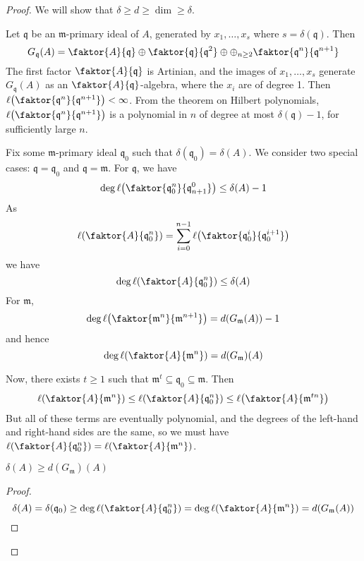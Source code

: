 \begin{proof}
    We will show that \( \delta \geq d \geq \dim \geq \delta \).

    Let \( \mathfrak q \) be an \( \mathfrak m \)-primary ideal of \( A \), generated by \( x_1, \dots, x_s \) where \( s = \delta(\mathfrak q) \).
    Then
    \[ G_{\mathfrak q}(A) = \faktor{A}{\mathfrak q} \oplus \faktor{\mathfrak q}{\mathfrak q^2} \oplus \oplus_{n \geq 2} \faktor{\mathfrak q^n}{\mathfrak q^{n+1}} \]
    The first factor \( \faktor{A}{\mathfrak q} \) is Artinian, and the images of \( x_1, \dots, x_s \) generate \( G_{\mathfrak q}(A) \) as an \( \faktor{A}{\mathfrak q} \)-algebra, where the \( x_i \) are of degree 1.
    Then \( \ell\qty(\faktor{\mathfrak q^n}{\mathfrak q^{n+1}}) < \infty \).
    From the theorem on Hilbert polynomials, \( \ell\qty(\faktor{\mathfrak q^n}{\mathfrak q^{n+1}}) \) is a polynomial in \( n \) of degree at most \( \delta(\mathfrak q) - 1 \), for sufficiently large \( n \).

    Fix some \( \mathfrak m \)-primary ideal \( \mathfrak q_0 \) such that \( \delta(\mathfrak q_0) = \delta(A) \).
    We consider two special cases: \( \mathfrak q = \mathfrak q_0 \) and \( \mathfrak q = \mathfrak m \).
    For \( \mathfrak q \), we have
    \[ \deg \ell\qty(\faktor{\mathfrak q_0^n}{\mathfrak q^0_{n+1}}) \leq \delta(A) - 1 \]
    As
    \[ \ell\qty(\faktor{A}{\mathfrak q_0^n}) = \sum_{i=0}^{n-1} \ell\qty(\faktor{\mathfrak q_0^i}{\mathfrak q_0^{i+1}}) \]
    we have
    \[ \deg \ell\qty(\faktor{A}{\mathfrak q_0^n}) \leq \delta(A) \]
    For \( \mathfrak m \),
    \[ \deg \ell\qty(\faktor{\mathfrak m^n}{\mathfrak m^{n+1}}) = d(G_{\mathfrak m}(A)) - 1 \]
    and hence
    \[ \deg \ell\qty(\faktor{A}{\mathfrak m^n}) = d(G_{\mathfrak m})(A) \]

    Now, there exists \( t \geq 1 \) such that \( \mathfrak m^t \subseteq \mathfrak q_0 \subseteq \mathfrak m \).
    Then
    \[ \ell\qty(\faktor{A}{\mathfrak m^n}) \leq \ell\qty(\faktor{A}{\mathfrak q_0^n}) \leq \ell\qty(\faktor{A}{\mathfrak m^{tn}}) \]
    But all of these terms are eventually polynomial, and the degrees of the left-hand and right-hand sides are the same, so we must have \( \ell\qty(\faktor{A}{\mathfrak q_0^n}) = \ell\qty(\faktor{A}{\mathfrak m^n}) \).

    \begin{proposition}
        \( \delta(A) \geq d(G_{\mathfrak m})(A) \)
    \end{proposition}
    \begin{proof}
        \[ \delta(A) = \delta(\mathfrak q_0) \geq \deg \ell\qty(\faktor{A}{\mathfrak q_0^n}) = \deg \ell\qty(\faktor{A}{\mathfrak m^n}) = d(G_{\mathfrak m}(A)) \]
    \end{proof}


\end{proof}
